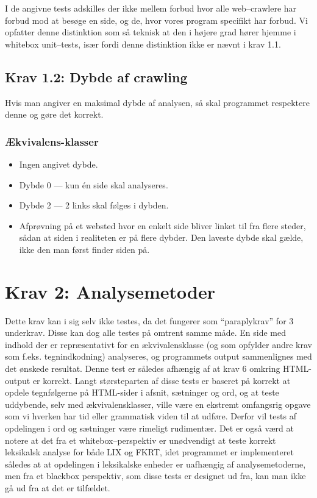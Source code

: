 \documentclass[a4paper,oneside,article]{memoir}
\begin{document}
I de angivne tests adskilles der ikke mellem forbud hvor alle
web--crawlere har forbud mod at besøge en side, og de, hvor vores
program specifikt har forbud. Vi opfatter denne distinktion som så
teknisk at den i højere grad hører hjemme i whitebox unit--tests, især
fordi denne distinktion ikke er nævnt i krav 1.1.

\subsection{Krav 1.2: Dybde af crawling}
Hvis man angiver en maksimal dybde af analysen, så skal programmet
respektere denne og gøre det korrekt.

\subsubsection{Ækvivalens-klasser}
\begin{itemize}
\item Ingen angivet dybde.
\item Dybde 0 --- kun én side skal analyseres.
\item Dybde 2 --- 2 links skal følges i dybden.
\item Afprøvning på et websted hvor en enkelt side bliver linket til
  fra flere steder, sådan at siden i realiteten er på flere
  dybder. Den laveste dybde skal gælde, ikke den man først finder
  siden på.
\end{itemize}

\section{Krav 2: Analysemetoder}

Dette krav kan i sig selv ikke testes, da det fungerer som
``paraplykrav'' for 3 underkrav. Disse kan dog alle testes på omtrent
samme måde. En side med indhold der er repræsentativt for en
ækvivalensklasse (og som opfylder andre krav som
f.eks. tegnindkodning) analyseres, og programmets output sammenlignes
med det ønskede resultat. Denne test er således afhængig af at krav 6
omkring HTML-output er korrekt. Langt størsteparten af disse tests er
baseret på korrekt at opdele tegnfølgerne på HTML-sider i afsnit,
sætninger og ord, og at teste uddybende, selv med ækvivalensklasser,
ville være en ekstremt omfangsrig opgave som vi hverken har tid eller
grammatisk viden til at udføre. Derfor vil tests af opdelingen i ord
og sætninger være rimeligt rudimentær. Det er også værd at notere at
det fra et whitebox--perspektiv er unødvendigt at teste korrekt
leksikalsk analyse for både LIX og FKRT, idet programmet er
implementeret således at at opdelingen i leksikalske enheder er
uafhængig af analysemetoderne, men fra et blackbox perspektiv, som
disse tests er designet ud fra, kan man ikke gå ud fra at det er
tilfældet.
\end{document}
